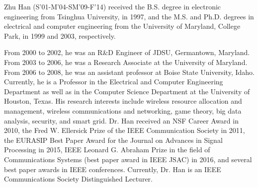 \documentclass[twocolumn,10pt]{IEEEtran}
\begin{document}
\begin{IEEEbiography}{Zhu Han} (S'01-M'04-SM'09-F'14) received the B.S. degree in electronic engineering from Tsinghua University, in 1997, and the M.S. and Ph.D. degrees in electrical and computer engineering from the University of Maryland, College Park, in 1999 and 2003, respectively.

From 2000 to 2002, he was an R\&D Engineer of JDSU, Germantown, Maryland. From 2003 to 2006, he was a Research Associate at the University of Maryland. From 2006 to 2008, he was an assistant professor at Boise State University, Idaho. Currently, he is a Professor in the Electrical and Computer Engineering Department as well as in the Computer Science Department at the University of Houston, Texas. His research interests include wireless resource allocation and management, wireless communications and networking, game theory, big data analysis, security, and smart grid. Dr. Han received an NSF Career Award in 2010, the Fred W. Ellersick Prize of the IEEE Communication Society in 2011, the EURASIP Best Paper Award for the Journal on Advances in Signal Processing in 2015, IEEE Leonard G. Abraham Prize in the field of Communications Systems (best paper award in IEEE JSAC) in 2016, and several best paper awards in IEEE conferences. Currently, Dr. Han is an IEEE Communications Society Distinguished Lecturer.
\end{IEEEbiography}
\end{document}

